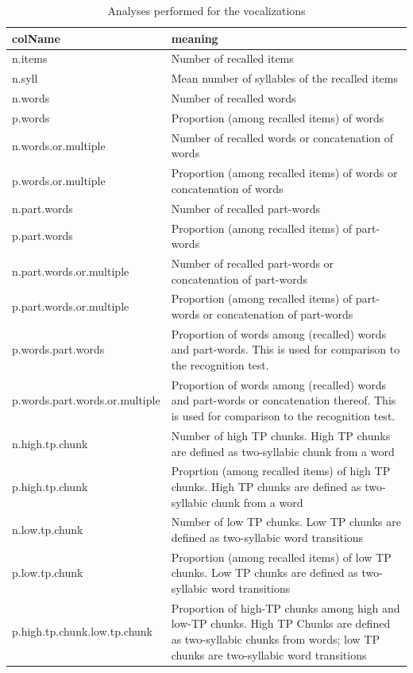 \documentclass[
]{article}
\begin{document}
\begin{longtable}[t]{l>{\raggedright\arraybackslash}p{30em}}
\caption{\label{tab:recall-print-used-column-attributes}Analyses performed for the vocalizations}\\
\toprule
colName & meaning\\
\midrule
n.items & Number of recalled items\\
n.syll & Mean number of syllables of the recalled items\\
n.words & Number of recalled words\\
p.words & Proportion (among recalled items) of words\\
n.words.or.multiple & Number of recalled words or concatenation of words\\
\addlinespace
p.words.or.multiple & Proportion (among recalled items) of words or concatenation of words\\
n.part.words & Number of recalled part-words\\
p.part.words & Proportion (among recalled items) of part-words\\
n.part.words.or.multiple & Number of recalled part-words or concatenation of part-words\\
p.part.words.or.multiple & Proportion (among recalled items) of part-words or concatenation of part-words\\
\addlinespace
p.words.part.words & Proportion of words among (recalled) words and part-words. This is used for comparison to the recognition test.\\
p.words.part.words.or.multiple & Proportion of words among (recalled) words and part-words or concatenation thereof. This is used for comparison to the recognition test.\\
n.high.tp.chunk & Number of high TP chunks. High TP chunks are defined as two-syllabic chunk from a word\\
p.high.tp.chunk & Proprtion (among recalled items) of high TP chunks. High TP chunks are defined as two-syllabic chunk from a word\\
n.low.tp.chunk & Number of low TP chunks. Low TP chunks are defined as two-syllabic word transitions\\
\addlinespace
p.low.tp.chunk & Proportion (among recalled items) of low TP chunks. Low TP chunks are defined as two-syllabic word transitions\\
p.high.tp.chunk.low.tp.chunk & Proportion of high-TP chunks among high and low-TP chunks. High TP Chunks are defined as two-syllabic chunks from words; low TP chunks are two-syllabic word transitions\\

\end{longtable}
\end{document}

